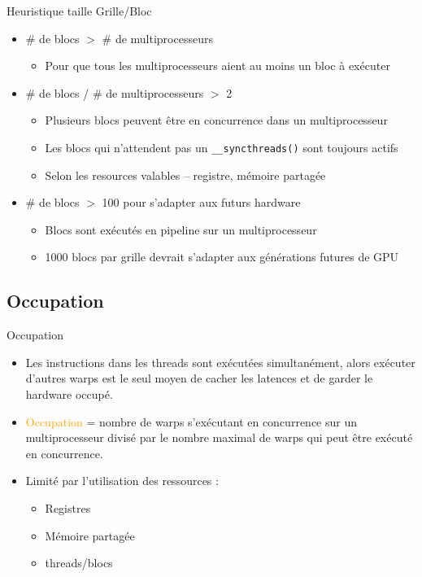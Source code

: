 \documentclass{beamer}
\begin{document}
\begin{frame}{Heuristique taille Grille/Bloc}

  \begin{itemize}
  \item \# de blocs $>$ \# de multiprocesseurs
    \begin{itemize}
    \item Pour que tous les multiprocesseurs aient au moins un bloc à exécuter
    \end{itemize}
  \item \# de blocs / \# de multiprocesseurs $>$ 2
    \begin{itemize}
    \item Plusieurs blocs peuvent être en concurrence dans un multiprocesseur
    \item Les blocs qui n'attendent pas un  \texttt{\_\_syncthreads()} sont toujours actifs
    \item Selon les resources valables -- registre, mémoire partagée
    \end{itemize}
  \item \# de blocs $>$ 100 pour s'adapter aux futurs hardware
    \begin{itemize}
    \item Blocs sont exécutés en pipeline sur un multiprocesseur
    \item 1000 blocs par grille devrait s'adapter aux générations futures de GPU
    \end{itemize}
  \end{itemize}
\end{frame}

\subsection{Occupation}

\begin{frame}{Occupation}

  \begin{itemize}
  \item Les instructions dans les threads sont exécutées simultanément, alors 
    exécuter d'autres warps est le seul moyen de cacher les latences et de
    garder le hardware occupé.
  \item \textcolor{orange}{Occupation} = nombre de warps
    s'exécutant en concurrence sur un multiprocesseur divisé
    par le nombre maximal de warps qui peut être exécuté en concurrence.
  \item Limité par l'utilisation des ressources :
    \begin{itemize}
    \item Registres
    \item Mémoire partagée
    \item threads/blocs
    \end{itemize}
\end{itemize}
\end{frame}
\end{document}
